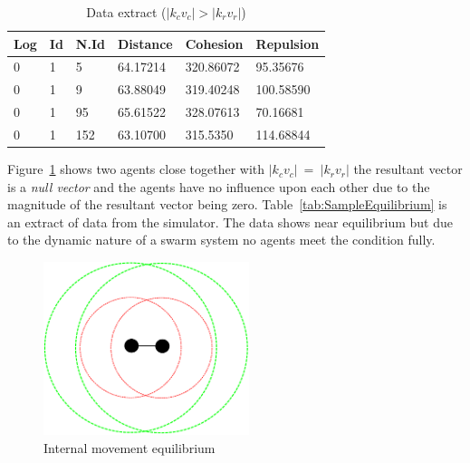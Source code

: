 \documentclass[10pt,journal,letterpaper,twoside]{IEEEtran}
\begin{document}
\begin{table}[H]
\begin{center}
\begin{tabular}{| l | l | l | l | l | l |}
\hline
Log &	Id &	N.Id &	Distance &	{\color{green}Cohesion} & {\color{red}Repulsion} 	\\ \hline
0 & 1 & 5 &	64.17214 &	{\color{green}320.86072} &	{\color{red}95.35676} \\ \hline
0 & 1 & 9 &	63.88049 &	{\color{green}319.40248} &	{\color{red}100.58590} \\ \hline
0 & 1 & 95 & 65.61522 &	{\color{green}328.07613} &	{\color{red}70.16681} \\ \hline
0 & 1 & 152 & 63.10700 & {\color{green}315.5350} & {\color{red}114.68844} \\ 
\hline
\end{tabular}\caption{Data extract ($|k_cv_c| > |k_rv_r|$)} \label{tab:SampleCohesionPositive}
\end{center}
\end{table}

Figure~\ref{methods:Stability4} shows two agents close together with $|k_cv_c|~=~|k_rv_r|$ the resultant vector is a \textit{null vector} and the agents have no influence upon each other due to the magnitude of the resultant vector being zero. Table~\ref{tab:SampleEquilibrium} is an extract of data from the simulator. The data shows near equilibrium but due to the dynamic nature of a swarm system no agents meet the condition fully. 

\begin{figure}[H]
\begin{center}
\includegraphics[width=6cm]{figures/Stability4}
\end{center}
\caption{Internal movement equilibrium} \label{methods:Stability4}
\end{figure}
\end{document}
